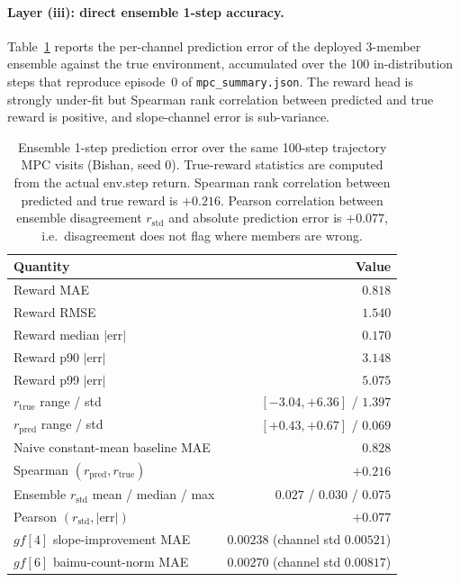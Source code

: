 \documentclass[11pt]{article}
\begin{document}
\paragraph{Layer (iii): direct ensemble 1-step accuracy.} Table~\ref{tab:si-mae} reports the per-channel prediction error of the deployed 3-member ensemble against the true environment, accumulated over the 100 in-distribution steps that reproduce episode~0 of \texttt{mpc\_summary.json}. The reward head is strongly under-fit but Spearman rank correlation between predicted and true reward is positive, and slope-channel error is sub-variance.

\begin{table}[htbp]
\centering
\small
\caption{Ensemble 1-step prediction error over the same 100-step trajectory MPC visits (Bishan, seed 0). True-reward statistics are computed from the actual env.step return. Spearman rank correlation between predicted and true reward is $+0.216$. Pearson correlation between ensemble disagreement $r_{\text{std}}$ and absolute prediction error is $+0.077$, i.e.\ disagreement does not flag where members are wrong.}
\label{tab:si-mae}
\begin{tabular}{lr}
\toprule
Quantity & Value \\
\midrule
Reward MAE & $0.818$ \\
Reward RMSE & $1.540$ \\
Reward median $|\text{err}|$ & $0.170$ \\
Reward p90 $|\text{err}|$ & $3.148$ \\
Reward p99 $|\text{err}|$ & $5.075$ \\
$r_{\text{true}}$ range / std & $[-3.04, +6.36]$ / $1.397$ \\
$r_{\text{pred}}$ range / std & $[+0.43, +0.67]$ / $0.069$ \\
Naive constant-mean baseline MAE & $0.828$ \\
Spearman $(r_{\text{pred}}, r_{\text{true}})$ & $+0.216$ \\
Ensemble $r_{\text{std}}$ mean / median / max & $0.027$ / $0.030$ / $0.075$ \\
Pearson $(r_{\text{std}}, |\text{err}|)$ & $+0.077$ \\
$gf[4]$ slope-improvement MAE & $0.00238$ (channel std $0.00521$) \\
$gf[6]$ baimu-count-norm MAE & $0.00270$ (channel std $0.00817$) \\
\bottomrule
\end{tabular}
\end{table}
\end{document}

